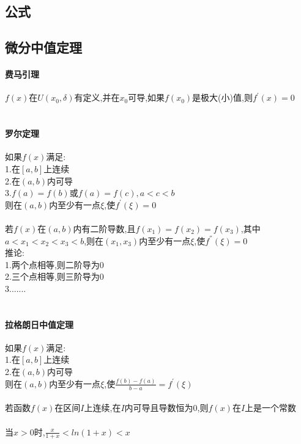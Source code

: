 \documentclass{article}
\begin{document}
\begin{flushleft}
	\LARGE
	
	\section{公式}
	
	\subsection{微分中值定理}
	
	\paragraph{费马引理}
	$f(x)$在$U(x_0,\delta)$有定义,并在$x_0$可导,如果$f(x_0)$是极大(小)值,则$f^{'}(x)=0$\\
	~\\
	\paragraph{罗尔定理}
	如果$f(x)$满足:\\
	1.在$[a,b]$上连续\\
	2.在$(a,b)$内可导\\
	3.$f(a)=f(b)$或$f(a)=f(c), a<c<b$\\
	则在$(a,b)$内至少有一点$\xi$,使$f^{'}(\xi)=0$\\
	~\\
	若$f(x)$在$(a,b)$内有二阶导数,且$f(x_1)=f(x_2)=f(x_3)$,其中$a<x_1<x_2<x_3<b$,则在$(x_1,x_3)$内至少有一点$\xi$,使$f^{''}(\xi)=0$\\
	推论:\\
	1.两个点相等,则二阶导为0\\
	2.三个点相等,则三阶导为0\\
	3.......\\
	~\\
	\paragraph{拉格朗日中值定理}
	如果$f(x)$满足:\\
	1.在$[a,b]$上连续\\
	2.在$(a,b)$内可导\\
	则在$(a,b)$内至少有一点$\xi$,使$\frac{f(b)-f(a)}{b-a}=f^{'}(\xi)$\\
	~\\
	若函数$f(x)$在区间$I$上连续,在$I$内可导且导数恒为0,则$f(x)$在$I$上是一个常数\\
	~\\
	当$x>0$时,$\frac{x}{1+x}<ln(1+x)<x$\\
	~\\

\end{flushleft}
\end{document}
